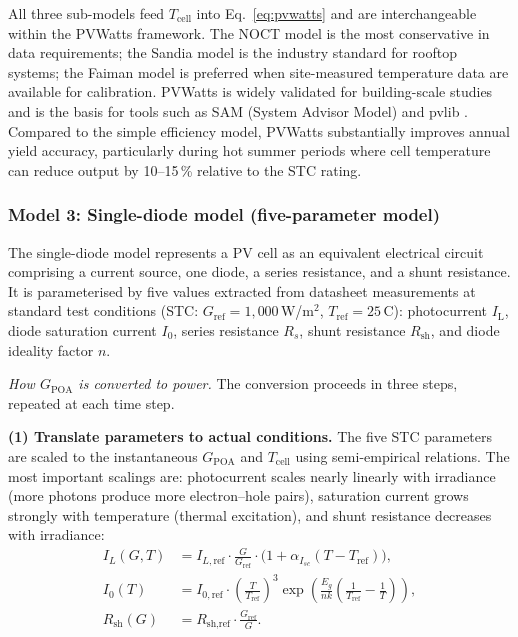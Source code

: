 \documentclass[11pt,a4paper]{report}
\begin{document}
\noindent All three sub-models feed $T_{\text{cell}}$ into Eq.~\eqref{eq:pvwatts} and are interchangeable within the PVWatts framework.
The NOCT model is the most conservative in data requirements; the Sandia model is the industry standard for rooftop systems; the Faiman model is preferred when site-measured temperature data are available for calibration.
PVWatts is widely validated for building-scale studies and is the basis for tools such as SAM (System Advisor Model) and pvlib \cite{Dobos2014PVWatts}.
Compared to the simple efficiency model, PVWatts substantially improves annual yield accuracy, particularly during hot summer periods where cell temperature can reduce output by 10--15\,\% relative to the STC rating.

\subsubsection{Model 3: Single-diode model (five-parameter model)}

The single-diode model \cite{DeSoto2006} represents a PV cell as an equivalent electrical circuit comprising a current source, one diode, a series resistance, and a shunt resistance.
It is parameterised by five values extracted from datasheet measurements at standard test conditions (STC: $G_\text{ref} = 1{,}000$\,W/m$^2$, $T_\text{ref} = 25$\,\textdegree C): photocurrent $I_\text{L}$, diode saturation current $I_0$, series resistance $R_s$, shunt resistance $R_\text{sh}$, and diode ideality factor $n$.

\textit{How $G_{\text{POA}}$ is converted to power.}
The conversion proceeds in three steps, repeated at each time step.

\textbf{(1) Translate parameters to actual conditions.}
The five STC parameters are scaled to the instantaneous $G_{\text{POA}}$ and $T_{\text{cell}}$ using semi-empirical relations.
The most important scalings are: photocurrent scales nearly linearly with irradiance (more photons produce more electron--hole pairs), saturation current grows strongly with temperature (thermal excitation), and shunt resistance decreases with irradiance:
\begin{align}
    I_L(G,T)        &= I_{L,\text{ref}}\cdot\frac{G}{G_\text{ref}}\cdot\bigl(1+\alpha_{I_{sc}}(T-T_\text{ref})\bigr), \label{eq:sdm_il}\\
    I_0(T)          &= I_{0,\text{ref}}\cdot\!\left(\frac{T}{T_\text{ref}}\right)^{\!3}\exp\!\left(\frac{E_g}{nk}\!\left(\frac{1}{T_\text{ref}}-\frac{1}{T}\right)\right), \label{eq:sdm_i0}\\
    R_\text{sh}(G)  &= R_\text{sh,ref}\cdot\frac{G_\text{ref}}{G}. \label{eq:sdm_rsh}
\end{align}
\end{document}
